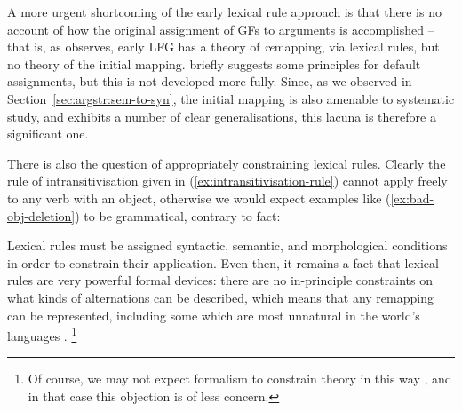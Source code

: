 \documentclass[output=paper]{langscibook}
\begin{document}

A more urgent shortcoming of the early lexical rule approach is that there is no
account of how the original assignment of GFs to arguments is accomplished --
that is, as \citet[96]{falk2001lexical} observes, early LFG has a theory of
\emph{re}mapping, via lexical rules, but no theory of the initial mapping.
\citet[112]{bresnan:polyadicity} briefly suggests some principles for default
assignments, but this is not developed more fully. Since, as we observed in
Section~\ref{sec:argstr:sem-to-syn}, the initial mapping is also amenable to systematic
study, and exhibits a number of clear generalisations, this lacuna is therefore
a significant one.

There is also the question of appropriately constraining lexical rules. Clearly
the rule of intransitivisation given in (\ref{ex:intransitivisation-rule})
cannot apply freely to any verb with an object, otherwise we would expect
examples like (\ref{ex:bad-obj-deletion}) to be grammatical, contrary to fact:

\ea
{}%
\label{ex:bad-obj-deletion}%
\z%
\z
%
Lexical rules must be assigned syntactic, semantic, and morphological conditions
in order to constrain their application. Even then, it remains a fact that
lexical rules are very powerful formal devices: there are no in-principle
constraints on what kinds of alternations can be described, which means that any
remapping can be represented, including some which are most unnatural in the
world's languages \citep[639ff.]{bresnan:polyadicity}.%
%
\footnote{Of course, we may not expect formalism to constrain theory in this way
  \citep[cf.][]{poll:97:nature}, and in that case this objection is of less
  concern.}
%
\end{document}
